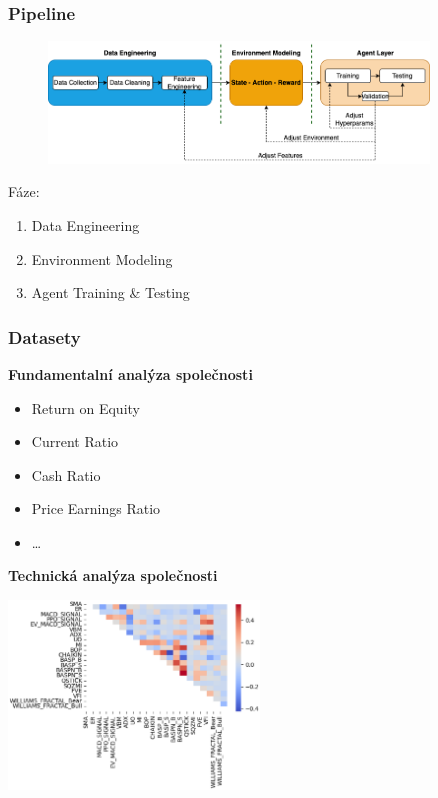 \begin{frame}
    \frametitle{Pipeline}
    \begin{center}
        \begin{figure}
            \centering
            \includegraphics[width=0.9\textwidth]{img/navrh_reseni}
        \end{figure}
    \end{center}
    {\Large Fáze:}
    \begin{enumerate}
        \item Data Engineering
        \item Environment Modeling
        \item Agent Training \& Testing
    \end{enumerate}
\end{frame}

\begin{frame}
    \frametitle{Datasety}
    \begin{multicols}{2}
        \textbf{Fundamentalní analýza společnosti}
        \begin{itemize}
            \item Return on Equity
            \item Current Ratio
            \item Cash Ratio
            \item Price Earnings Ratio
            \item \ldots
        \end{itemize}
        \columnbreak
        \textbf{Technická analýza společnosti}
        \begin{center}
            \centering
            \includegraphics[width=0.5\textwidth]{img/corr}
        \end{center}
    \end{multicols}
\end{frame}

